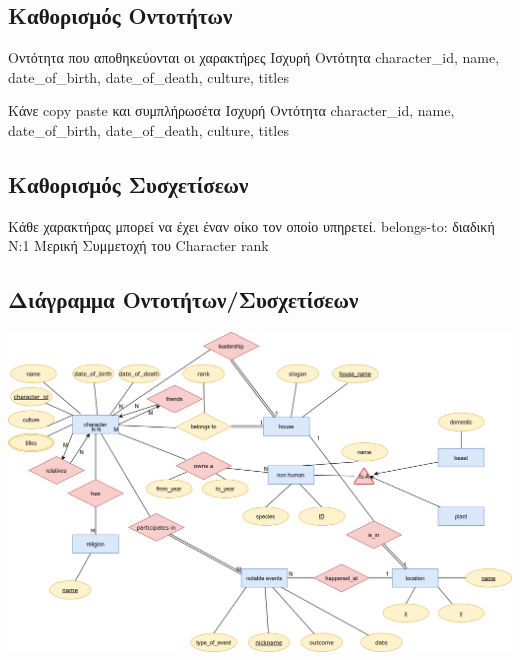 \documentclass[../main.tex]{subfiles}
\begin{document}
\subsection{Καθορισμός Οντοτήτων}

{Οντότητα που αποθηκεύονται οι χαρακτήρες}
{Ισχυρή Οντότητα}
{character\_id, name, date\_of\_birth, date\_of\_death, culture, titles}

{Κάνε copy paste και συμπλήρωσέτα}
{Ισχυρή Οντότητα}
{character\_id, name, date\_of\_birth, date\_of\_death, culture, titles}


\subsection{Καθορισμός Συσχετίσεων}

{Κάθε χαρακτήρας μπορεί να έχει έναν οίκο τον οποίο υπηρετεί.}
{belongs-to: διαδική}
{N:1}
{Μερική Συμμετοχή του Character}
{rank}

\subsection{Διάγραμμα Οντοτήτων/Συσχετίσεων}
\includegraphics[width=\textwidth]{../images/entity_relation_diagram.png}
\end{document}
